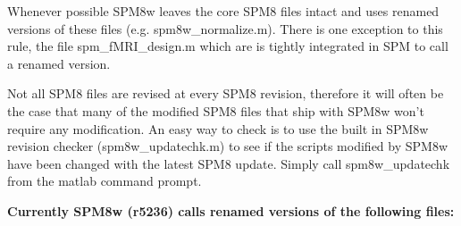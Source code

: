 \documentclass[12pt]{article}
\begin{document}
Whenever possible SPM8w leaves the core SPM8 files intact and uses renamed versions of these files (e.g. spm8w\_normalize.m). There is one exception to this rule, the file \newline spm\_fMRI\_design.m which are is tightly integrated in SPM to call a renamed version.

Not all SPM8 files are revised at every SPM8 revision, therefore it will often be the case that many of the modified SPM8 files that ship with SPM8w won't require any modification.  An easy way to check is to use the built in SPM8w revision checker (spm8w\_updatechk.m) to see if the scripts modified by SPM8w have been changed with the latest SPM8 update. Simply call spm8w\_updatechk from the matlab command prompt. 

\vspace{\baselineskip}
\noindent
\textbf{Currently SPM8w (r5236) calls renamed versions of the following files:}
\end{document}
